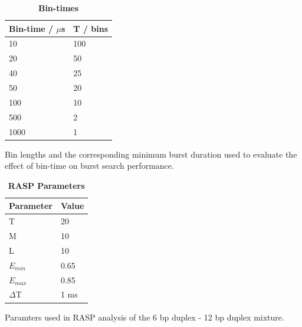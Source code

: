 \documentclass[10pt]{article}
\begin{document}
\begin{table}[!ht]
\caption{
\bf{Bin-times}}
\begin{tabular}{|l|l|}
\hline
Bin-time / $\mu$s & T / bins \\
\hline
10 & 100 \\
20 & 50 \\
40 & 25 \\
50 & 20 \\
100 & 10 \\
500 & 2 \\
1000 & 1\\
\hline
\end{tabular}
\begin{flushleft}
Bin lengths and the corresponding minimum burst duration used to evaluate the effect of bin-time on burst search performance.\end{flushleft}
\label{tab:bin-times}
\end{table}



\begin{table}[!ht]
\caption{
\bf{RASP Parameters}}
\begin{tabular}{|l|l|}
\hline
Parameter & Value \\
\hline
T & 20 \\
M & 10 \\
L & 10 \\
$E_{min}$ & 0.65 \\
$E_{max}$ & 0.85 \\
$\Delta$T & 1 ms \\
\hline
\end{tabular}
\begin{flushleft}
Paramters used in RASP analysis of the 6 bp duplex - 12 bp duplex mixture.
\end{flushleft}
\label{tab:RASP}
\end{table}
\end{document}
